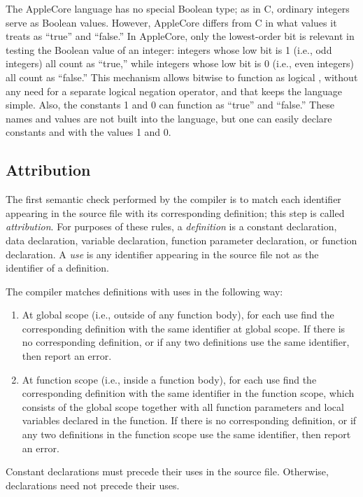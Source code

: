 \documentclass[10pt]{article}
\begin{document}
 The AppleCore language has no special Boolean
type; as in C, ordinary integers serve as Boolean values.  However,
AppleCore differs from C in what values it treats as ``true'' and
``false.''  In AppleCore, only the lowest-order bit is relevant in
testing the Boolean value of an integer: integers whose low bit is 1
(i.e., odd integers) all count as ``true,'' while integers whose low
bit is 0 (i.e., even integers) all count as ``false.''  This mechanism
allows bitwise  to function as logical , without any
need for a separate logical negation operator, and that keeps the
language simple.  Also, the constants 1 and 0 can function as ``true''
and ``false.''  These names and values are not built into the
language, but one can easily declare constants  and
 with the values 1 and 0.

\subsection{Attribution}
\label{sec:semantics:attr}

The first semantic check performed by the compiler is to match each
identifier appearing in the source file with its corresponding
definition; this step is called \emph{attribution}.  For purposes of
these rules, a \emph{definition} is a constant declaration, data
declaration, variable declaration, function parameter declaration, or
function declaration.  A \emph{use} is any identifier appearing in the
source file not as the identifier of a definition.

The compiler matches definitions with uses in the following way:
%
\begin{enumerate}
%
\item At global scope (i.e., outside of any function body), for each
  use find the corresponding definition with the same identifier at
  global scope.  If there is no corresponding definition, or if any
  two definitions use the same identifier, then  report an error.
%
\item At function scope (i.e., inside a function body), for each use
  find the corresponding definition with the same identifier in the
  function scope, which consists of the global scope together with all
  function parameters and local variables declared in the function.
  If there is no corresponding definition, or if any two definitions
  in the function scope use the same identifier, then report an error.
%
\end{enumerate}
% 
Constant declarations must precede their uses in the source file.
Otherwise, declarations need not precede their uses.
\end{document}
